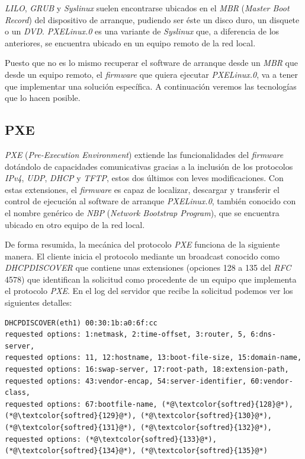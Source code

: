 \documentclass[a4paper,12pt,spanish,final]{epsc_tfc_pfc}
\begin{document}
\emph{LILO}, \emph{GRUB} y \emph{Syslinux} suelen encontrarse ubicados en el \emph{MBR} (\emph{Master Boot Record}) del dispositivo de arranque, pudiendo ser éste un disco duro, un disquete o un \emph{DVD}. \emph{PXELinux.0} es una variante de \emph{Syslinux} que, a diferencia de los anteriores, se encuentra ubicado en un equipo remoto de la red local.

Puesto que no es lo mismo recuperar el software de arranque desde un \emph{MBR} que desde un equipo remoto, el \emph{firmware} que quiera ejecutar \emph{PXELinux.0}, va a tener que implementar una solución específica. A continuación veremos las tecnologías que lo hacen posible.

\subsection{PXE}
\emph{PXE} (\emph{Pre-Execution Environment}) extiende las funcionalidades del \emph{firmware} dotándolo de capacidades comunicativas gracias a la inclusión de los protocolos \emph{IPv4}, \emph{UDP}, \emph{DHCP} y \emph{TFTP}, estos dos últimos con leves modificaciones. Con estas extensiones, el \emph{firmware} es capaz de localizar, descargar y transferir el control de ejecución al software de arranque \emph{PXELinux.0}, también conocido con el nombre genérico de \emph{NBP} (\emph{Network Bootstrap Program}), que se encuentra ubicado en otro equipo de la red local.

De forma resumida, la mecánica del protocolo \emph{PXE} funciona de la siguiente manera. El cliente inicia el protocolo mediante un broadcast conocido como \emph{DHCPDISCOVER} que contiene unas extensiones (opciones 128 a 135 del \emph{RFC} 4578) que identifican la solicitud como procedente de un equipo que implementa el protocolo \emph{PXE}. En el log del servidor que recibe la solicitud podemos ver los siguientes detalles:\\

\begin{lstlisting}[style=dnsmasq]
DHCPDISCOVER(eth1) 00:30:1b:a0:6f:cc
requested options: 1:netmask, 2:time-offset, 3:router, 5, 6:dns-server,
requested options: 11, 12:hostname, 13:boot-file-size, 15:domain-name,
requested options: 16:swap-server, 17:root-path, 18:extension-path,
requested options: 43:vendor-encap, 54:server-identifier, 60:vendor-class,
requested options: 67:bootfile-name, (*@\textcolor{softred}{128}@*), (*@\textcolor{softred}{129}@*), (*@\textcolor{softred}{130}@*), (*@\textcolor{softred}{131}@*), (*@\textcolor{softred}{132}@*),
requested options: (*@\textcolor{softred}{133}@*), (*@\textcolor{softred}{134}@*), (*@\textcolor{softred}{135}@*)
\end{lstlisting}
\end{document}
